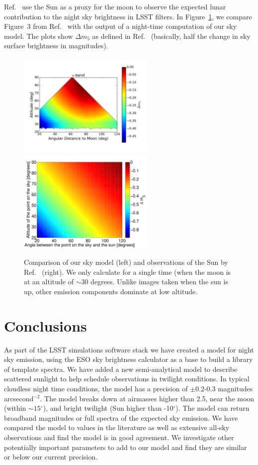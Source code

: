 \documentclass[]{spie}
\newcommand\degree{{^\circ}}
\begin{document}
Ref.~ use the Sun as a proxy for the moon to observe the expected lunar contribution to the night sky brightness in LSST filters. In Figure~\ref{fig:cCompare}, we compare Figure~3 from Ref.~ with the output of a night-time computation of our sky model.  The plots show $\Delta m_5$ as defined in Ref.~ (basically, half the change in sky surface brightness in magnitudes).  

\begin{figure}
  \begin{center}
  \includegraphics[height=5cm]{plots/deltam5.pdf}\includegraphics[height=5cm]{plots/a1_alt_angle_meshgrid.pdf}
  \end{center}
  \caption{ Comparison of our sky model (left) and observations of the Sun by Ref.~ (right).  We only calculate for a single time (when the moon is at an altitude of $\sim 30$ degrees. Unlike images taken when the sun is up, other emission components dominate at low altitude.  \label{fig:cCompare}}
\end{figure}

\section{Conclusions}

As part of the LSST simulations software stack we have created a model for night sky emission, using the ESO sky brightness calculator as a base to build a library of template spectra.  We have added a new semi-analytical model to describe scattered sunlight to help schedule observations in twilight conditions.  In typical cloudless night time conditions, the model has a precision of $\pm$0.2-0.3 magnitudes arcsecond$^{-2}$. The model breaks down at airmasses higher than 2.5, near the moon (within $\sim15\degree$), and bright twilight (Sun higher than -10$\degree$).  The model can return broadband magnitudes or full spectra of the expected sky emission.  We have compared the model to values in the literature as well as extensive all-sky observations and find the model is in good agreement. We investigate other potentially important parameters to add to our model and find they are similar or below our current precision. 
\end{document}
